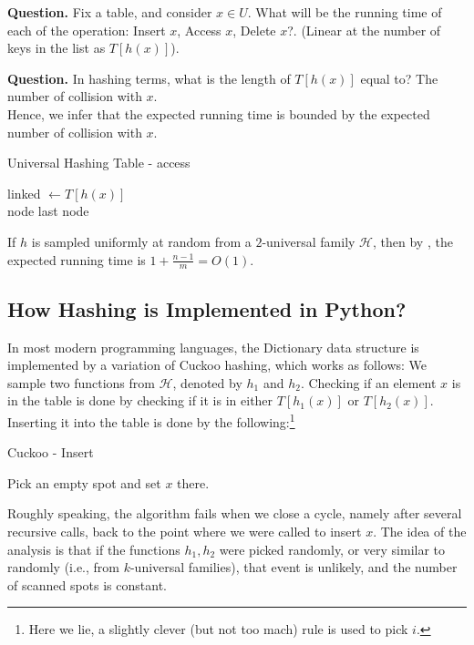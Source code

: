 \textbf{Question.} Fix a table, and consider $x \in U$. What will be the running time of each of the operation: Insert $x$, Access $x$, Delete $x$?. (Linear at the number of keys in the list as $T[h(x)]$).  

\textbf{Question.} In hashing terms, what is the length of $T[h(x)]$ equal to? The number of collision with $x$.  
\\

Hence, we infer that the expected running time is bounded by the expected number of collision with $x$. 
  \begin{algorithm}
    \label{alg:openhash}
  \caption{Universal Hashing Table - access}
  linked $\leftarrow  T[h(x)] $  \\
   {
     {
      \Return node
    }
  }
  \Return last node
  \end{algorithm}
If $h$ is sampled uniformly at random from a $2$-universal family $\mathcal{H}$, then by , the expected running time is $1 + \frac{n-1}{m} = O(1)$.


\subsection{How Hashing is Implemented in Python?} 
In most modern programming languages, the Dictionary data structure is implemented by a variation of Cuckoo hashing, which works as follows: We sample two functions from $\mathcal{H}$, denoted by $h_{1}$ and $h_{2}$. Checking if an element $x$ is in the table is done by checking if it is in either $T[h_{1}(x)]$ or $T[h_{2}(x)]$. Inserting it into the table is done by the following:\footnote{Here we lie, a slightly clever (but not too mach) rule is used to pick $i$. }

  \begin{algorithm}
    \label{alg:cucko}
  \caption{Cuckoo - Insert}
     {
      Pick an empty spot and set $x$ there. \\
      \Return
    }
  \end{algorithm}
Roughly speaking, the algorithm fails when we close a cycle, namely after several recursive calls, back to the point where we were called to insert $x$. The idea of the analysis is that if the functions $h_{1}, h_{2}$ were picked randomly, or very similar to randomly (i.e., from $k$-universal families), that event is unlikely, and the number of scanned spots is constant.

